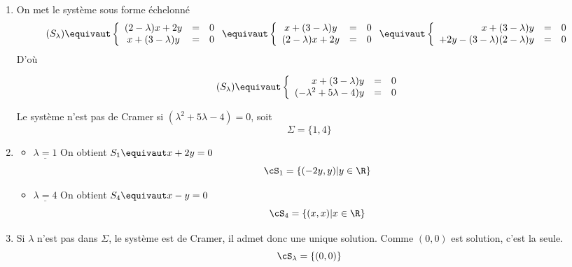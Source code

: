 \begin{correction}
\begin{enumerate}
\item  On met le système sous forme échelonné
$$(S_\lambda)\equivaut  \left\{ \begin{array}{ccc}
(2-\lambda)x +2y & =& 0\\
x +(3-\lambda)y  & =& 0
\end{array}\right.
\equivaut 
\left\{ \begin{array}{ccc}
x +(3-\lambda)y  & =& 0\\
(2-\lambda)x +2y & =& 0
\end{array}\right.
\equivaut 
\left\{ \begin{array}{rcc}
x +(3-\lambda)y  & =& 0\\
+2y -  (3-\lambda) (2-\lambda) y& =& 0
\end{array}\right.
 $$
 D'où 
 
 $$(S_\lambda)\equivaut  \left\{ \begin{array}{rcc}
x +(3-\lambda)y  & =& 0\\
  (-\lambda^2 +5\lambda -4) y& =& 0
\end{array}\right.$$
 
Le système n'est pas de Cramer si  $ (\lambda^2 +5\lambda -4) =0$, soit 
$$\Sigma =\{ 1, 4\}$$
\item \begin{itemize}
\item $\underline{\lambda=1}$
On obtient $S_1 \equivaut x+ 2y =0$
$$\cS_1 =\{ (-2y, y) | y \in \R\}$$

\item $\underline{\lambda=4}$
On obtient $S_4 \equivaut x-y =0$
$$\cS_4 =\{ (x, x) | x \in \R\}$$
\end{itemize}

\item Si $\lambda$ n'est pas dans $ \Sigma$, le système est de Cramer, il admet donc une unique solution. Comme $(0,0)$ est solution, c'est la seule. 
$$\cS_\lambda =\{ (0,0)\}$$
\end{enumerate}
\end{correction}




